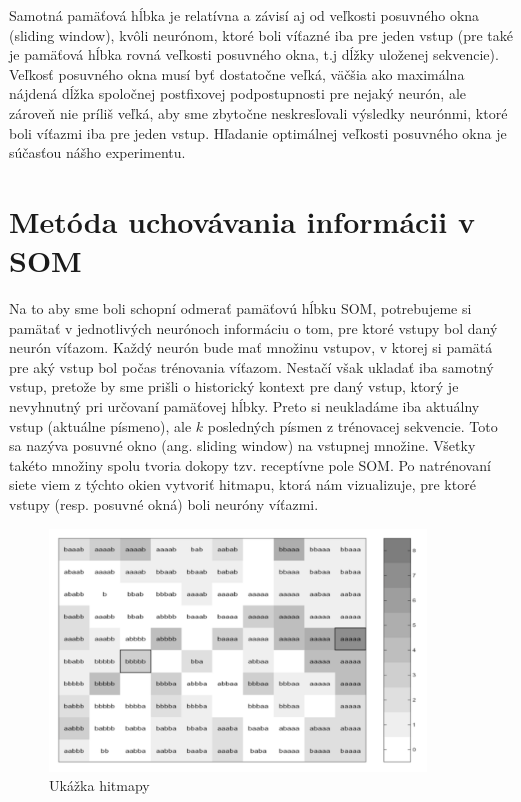 Samotná pamäťová hĺbka je relatívna a závisí aj od veľkosti posuvného okna (sliding window), kvôli 
neurónom, ktoré boli víťazné iba pre jeden vstup (pre také je pamäťová hĺbka rovná veľkosti posuvného okna, t.j dĺžky uloženej sekvencie).
Veľkosť posuvného okna musí byť dostatočne veľká, väčšia ako maximálna nájdená
dĺžka spoločnej postfixovej podpostupnosti pre nejaký neurón, ale zároveň nie príliš veľká, aby sme zbytočne neskresľovali výsledky neurónmi, ktoré boli víťazmi iba pre jeden vstup.
Hľadanie optimálnej veľkosti posuvného okna je súčasťou nášho experimentu.

\section{Metóda uchovávania informácii v SOM}
Na to aby sme boli schopní odmerať pamäťovú hĺbku SOM, potrebujeme si pamätať v jednotlivých
neurónoch informáciu o tom, pre ktoré vstupy bol daný neurón víťazom.
Každý neurón bude mať množinu vstupov, v ktorej si pamätá pre aký vstup bol počas trénovania víťazom. 
Nestačí však ukladať iba samotný vstup, pretože by sme prišli o historický kontext pre daný vstup, 
ktorý je nevyhnutný pri určovaní pamäťovej hĺbky. 
Preto si neukladáme iba aktuálny vstup (aktuálne písmeno), 
ale $k$ posledných písmen z trénovacej sekvencie.
Toto sa nazýva posuvné okno (ang. sliding window) na vstupnej množine. 
Všetky takéto množiny spolu tvoria dokopy tzv. receptívne pole SOM.
Po natrénovaní siete viem z týchto okien vytvoriť hitmapu, 
ktorá nám vizualizuje, pre ktoré vstupy (resp. posuvné okná) boli neuróny víťazmi.

\begin{figure}[H]
	\centering
	\includegraphics[width=10cm]{assets/receptive_field}
	\caption{Ukážka hitmapy}
\end{figure}

